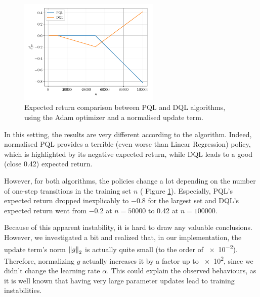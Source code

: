 \documentclass[a4paper, 12pt]{article}
\begin{document}
    \begin{figure}[h]
        \centering
        \includegraphics[width=0.6\textwidth]{resources/pdf/5_comparison_Adam_normed.pdf}
        \caption{Expected return comparison between PQL and DQL algorithms, using the Adam optimizer and a normalised update term.}
        \label{fig:experimental.protocol.results.normed}
    \end{figure}
    
    In this setting, the results are very different according to the algorithm. Indeed, normalised PQL provides a terrible (even worse than Linear Regression) policy, which is highlighted by its negative expected return, while DQL leads to a good (close \num{0.42}) expected return.
    
    However, for both algorithms, the policies change a lot depending on the number of one-step transitions in the training set $n$ (\cf{} Figure \ref{fig:experimental.protocol.results.normed}). Especially, PQL's expected return dropped inexplicably to \num{-0.8} for the largest set and DQL's expected return went from \num{-0.2} at $n = \num{50000}$ to \num{0.42} at $n = \num{100000}$.
    
    Because of this apparent instability, it is hard to draw any valuable conclusions. However, we investigated a bit and realized that, in our implementation, the update term's norm $\left\|g\right\|_2$ is actually quite small (to the order of \num{e-2}). Therefore, normalizing $g$ actually increases it by a factor up to \num{e2}, since we didn't change the learning rate $\alpha$. This could explain the observed behaviours, as it is well known that having very large parameter updates lead to training instabilities.

    \newpage

    \printbibliography
\end{document}
